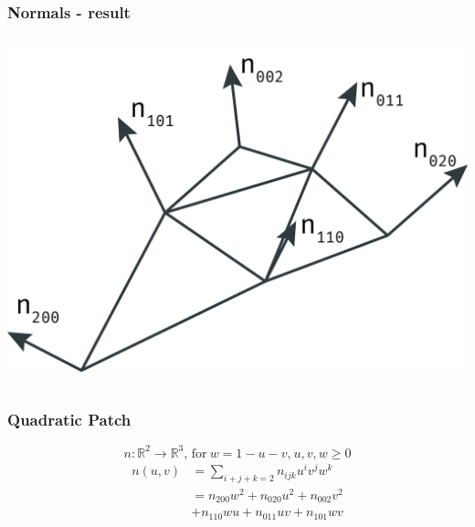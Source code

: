 	\begin{frame}
		\frametitle{Normals - result}
		\begin{columns}
			\begin{column}{0.6\textwidth}
				\begin{center}
					\includegraphics[width=\textwidth]{img/1_single/normals.png}
				\end{center}	
			\end{column}
		\end{columns}
	\end{frame}


	\begin{frame}\frametitle{Quadratic Patch}
		\begin{equation*}
			n: \mathbb{R}^2 \rightarrow \mathbb{R}^3 \text{, for}\ w = 1 - u - v \text{,}\ u, v, w \geq 0 
		\end{equation*}
		\begin{equation*}
			\begin{aligned}
			n(u,v) & = \sum\limits_{i+j+k=2} n_{ijk} u^i v^j w^k\\
			& = n_{200} w^2 + n_{020} u^2 + n_{002} v^2\\
			& + n_{110} w u + n_{011} u v + n_{101} w v
			\end{aligned}
		\end{equation*}
	\end{frame}	


